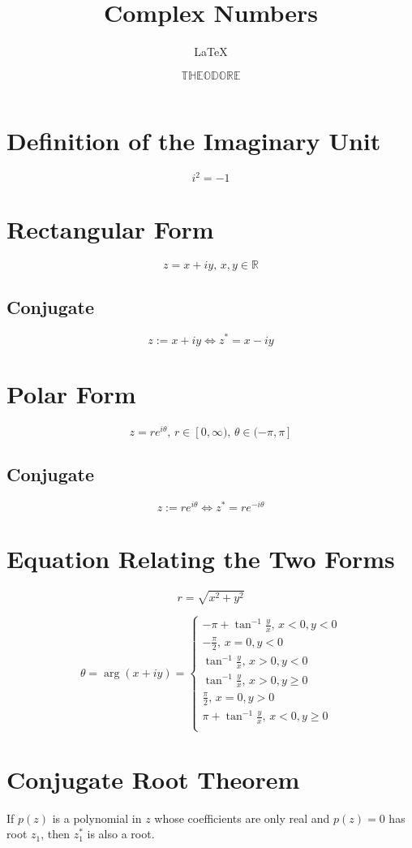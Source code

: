 \documentclass[a4paper]{article}
\title{Complex Numbers}
\date{\(\mathbb{THEODORE}\)}
\author{\LaTeX}
\begin{document}
\maketitle

\section{Definition of the Imaginary Unit}

\[i^2=-1\]

\section{Rectangular Form}

\[z=x+iy,\,x,y\in\mathbb R\]

\subsection{Conjugate}

\[z:=x+iy\iff z^*=x-iy\]

\section{Polar Form}

\[z=re^{i\theta},\,r\in[0,\infty),\,\theta\in(-\pi,\pi]\]

\subsection{Conjugate}

\[z:=re^{i\theta}\iff z^*=re^{-i\theta}\]

\section{Equation Relating the Two Forms}

\[r=\sqrt{x^2+y^2}\]

\[\theta=\arg(x+iy)=\begin{cases}
    -\pi+\tan^{-1}\frac yx,\,x<0,y<0\\
    -\frac\pi2,\,x=0,y<0\\
    \tan^{-1}\frac yx,\,x>0,y<0\\
    \tan^{-1}\frac yx,\,x>0,y\geqslant0\\
    \frac\pi2,\,x=0,y>0\\
    \pi+\tan^{-1}\frac yx,\,x<0,y\geqslant0\\
\end{cases}\]

\section{Conjugate Root Theorem}

If \(p(z)\) is a polynomial in \(z\) whose coefficients are only real and \(p(z)=0\) has root \(z_1\), then \(z_1^*\) is also a root.
\end{document}
